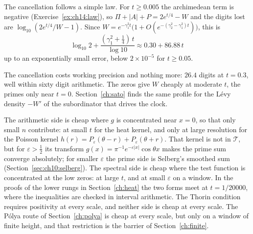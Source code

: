 The cancellation follows a simple law. For $t\ge0.005$ the archimedean term is negative (Exercise~\ref{ex:ch14:law}), so $\Pi+|A|+P=2e^{t/4}-W$ and the digits lost are $\log_{10}(2e^{t/4}/W-1)$. Since $W=e^{-\gamma_1^2t}\big(1+O(e^{-(\gamma_2^2-\gamma_1^2)t})\big)$, this is
\[
\log_{10}2+\frac{(\gamma_1^2+\frac14)\,t}{\log10}\approx0.30+86.88\,t
\]
up to an exponentially small error, below $2\times10^{-5}$ for $t\ge0.05$.

The cancellation costs working precision and nothing more: $26.4$ digits at $t=0.3$, well within sixty digit arithmetic. The zeros give $W$ cheaply at moderate $t$, the primes only near $t=0$. Section~\ref{ch:sato} finds the same profile for the L\'evy density $-W'$ of the subordinator that drives the clock.

The arithmetic side is cheap where $g$ is concentrated near $x=0$, so that only small $n$ contribute: at small $t$ for the heat kernel, and only at large resolution for the Poisson kernel $h(r)=P_\varepsilon(\theta-r)+P_\varepsilon(\theta+r)$. That kernel is not in $\mathcal T$, but for $\varepsilon>\frac12$ its transform $g(x)=\pi^{-1}e^{-\varepsilon|x|}\cos\theta x$ makes the prime sum converge absolutely; for smaller $\varepsilon$ the prime side is Selberg's smoothed sum (Section~\ref{sec:ch10:selberg}). The spectral side is cheap where the test function is concentrated at the low zeros: at large $t$, and at small $\varepsilon$ on a window. In the proofs of the lower rungs in Section~\ref{ch:heat} the two forms meet at $t=1/20000$, where the inequalities are checked in interval arithmetic. The Thorin condition requires positivity at every scale, and neither side is cheap at every scale. The P\'olya route of Section~\ref{ch:polya} is cheap at every scale, but only on a window of finite height, and that restriction is the barrier of Section~\ref{ch:finite}.
